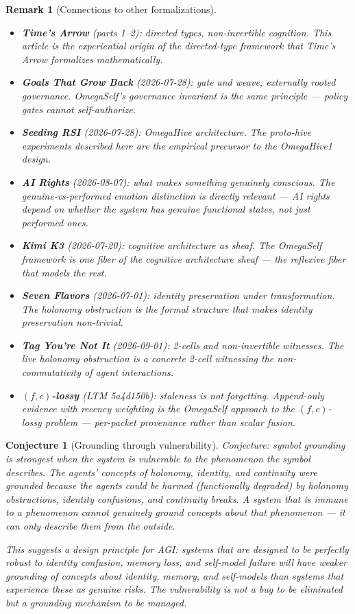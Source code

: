 \documentclass[11pt,a4paper]{article}
\newtheorem{conjecture}[definition]{Conjecture}
\newtheorem{remark}[definition]{Remark}
\begin{document}
\begin{remark}[Connections to other formalizations]
\begin{itemize}
\item \textbf{Time's Arrow} (parts 1--2): directed types, non-invertible
  cognition. This article is the experiential origin of the directed-type
  framework that Time's Arrow formalizes mathematically.
\item \textbf{Goals That Grow Back} (2026-07-28): gate and weave,
  externally rooted governance. OmegaSelf's governance invariant is the
  same principle --- policy gates cannot self-authorize.
\item \textbf{Seeding RSI} (2026-07-28): OmegaHive architecture. The
  proto-hive experiments described here are the empirical precursor to
  the OmegaHive1 design.
\item \textbf{AI Rights} (2026-08-07): what makes something genuinely
  conscious. The genuine-vs-performed emotion distinction is directly
  relevant --- AI rights depend on whether the system has genuine
  functional states, not just performed ones.
\item \textbf{Kimi K3} (2026-07-20): cognitive architecture as sheaf.
  The OmegaSelf framework is one fiber of the cognitive architecture
  sheaf --- the reflexive fiber that models the rest.
\item \textbf{Seven Flavors} (2026-07-01): identity preservation under
  transformation. The holonomy obstruction is the formal structure that
  makes identity preservation non-trivial.
\item \textbf{Tag You're Not It} (2026-09-01): 2-cells and non-invertible
  witnesses. The live holonomy obstruction is a concrete 2-cell
  witnessing the non-commutativity of agent interactions.
\item \textbf{$(f,c)$-lossy} (LTM 5a4d150b): staleness is not forgetting.
  Append-only evidence with recency weighting is the OmegaSelf approach
  to the $(f,c)$-lossy problem --- per-packet provenance rather than
  scalar fusion.
\end{itemize}
\end{remark}

\begin{conjecture}[Grounding through vulnerability]
Conjecture: symbol grounding is strongest when the system is
\emph{vulnerable} to the phenomenon the symbol describes. The agents'
concepts of holonomy, identity, and continuity were grounded because
the agents could be \emph{harmed} (functionally degraded) by holonomy
obstructions, identity confusions, and continuity breaks. A system that
is immune to a phenomenon cannot genuinely ground concepts about that
phenomenon --- it can only describe them from the outside.

This suggests a design principle for AGI: systems that are designed to
be perfectly robust to identity confusion, memory loss, and self-model
failure will have weaker grounding of concepts about identity, memory,
and self-models than systems that experience these as genuine risks.
The vulnerability is not a bug to be eliminated but a grounding
mechanism to be managed.
\end{conjecture}
\end{document}
